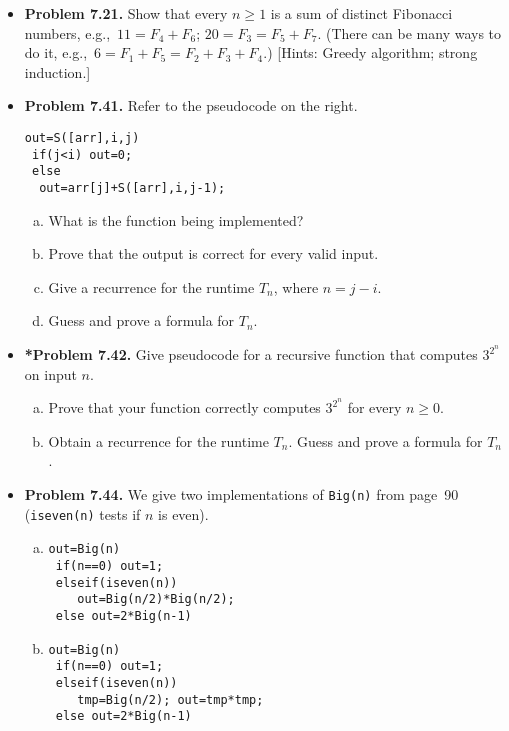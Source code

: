 \documentclass[11pt]{article}
\begin{document}
\begin{itemize}
\item \textbf{Problem 7.21.}
Show that every $n\ge 1$ is a sum of distinct Fibonacci numbers,
e.g.,~$11=F_4+F_6$; $20=F_3=F_5+F_7$.
(There can be many ways to do it, e.g.,~$6=F_1+F_5=F_2+F_3+F_4$.)
[Hints: Greedy algorithm; strong induction.]

\vspace{0.1in}

\item \textbf{Problem 7.41.}
Refer to the pseudocode on the right.
\begin{verbatim}
out=S([arr],i,j)
 if(j<i) out=0;
 else
  out=arr[j]+S([arr],i,j-1);
\end{verbatim}
\begin{enumerate}[(a)]
\item What is the function being implemented?
\item Prove that the output is correct for every valid input.
\item Give a recurrence for the runtime $T_n$, where $n=j-i$.
\item Guess and prove a formula for $T_n$.
\end{enumerate}

\vspace{0.1in}

\item \textbf{*Problem 7.42.}
Give pseudocode for a recursive function that computes $3^{2^n}$ on input $n$.
\begin{enumerate}[(a)]
\item Prove that your function correctly computes $3^{2^n}$ for every $n\ge 0$.
\item Obtain a recurrence for the runtime $T_n$.
  Guess and prove a formula for $T_n$.
\end{enumerate}

\vspace{0.1in}

\item \textbf{Problem 7.44.}
We give two implementations of \verb+Big(n)+ from page~90
(\verb+iseven(n)+ tests if $n$ is even).
\begin{multicols}{2}
\begin{enumerate}[(a)]
\item
\begin{verbatim}
out=Big(n)
 if(n==0) out=1;
 elseif(iseven(n))
    out=Big(n/2)*Big(n/2);
 else out=2*Big(n-1)
\end{verbatim}
\item
\begin{verbatim}
out=Big(n)
 if(n==0) out=1;
 elseif(iseven(n))
    tmp=Big(n/2); out=tmp*tmp;
 else out=2*Big(n-1)
\end{verbatim}
\end{enumerate}
\end{multicols}


\end{itemize}
\end{document}
